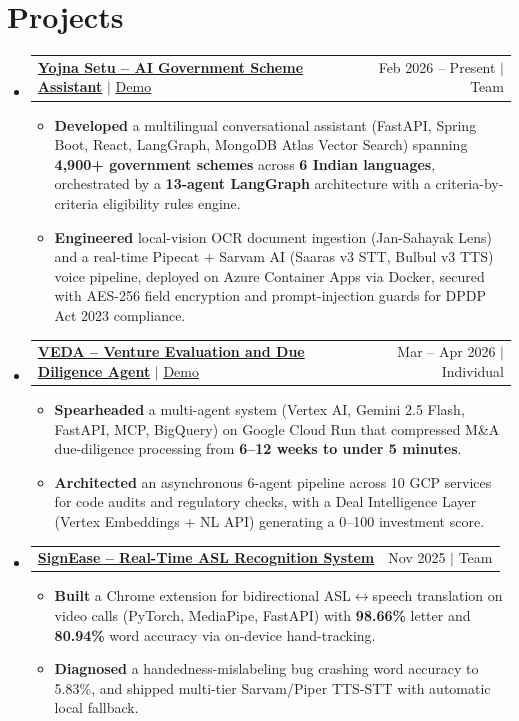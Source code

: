 \documentclass[letterpaper,11pt]{article}
\makeatletter
\newcommand{\resumeItem}[1]{\item\small{#1\vspace{-3pt}}}
\newcommand{\resumeProjectHeading}[2]{
  \item
  \begin{tabular*}{0.97\textwidth}{p{0.78\textwidth}@{\extracolsep{\fill}}r}
    \small #1 & \small #2 \\
  \end{tabular*}\vspace{-6pt}}
\newcommand{\resumeSubHeadingListStart}{\begin{itemize}[leftmargin=0.1in,label={},itemsep=0pt]}
\newcommand{\resumeSubHeadingListEnd}{\end{itemize}\vspace{-6pt}}
\newcommand{\resumeItemListStart}{\begin{itemize}[leftmargin=0.2in,itemsep=0pt]\vspace{-2pt}}
\newcommand{\resumeItemListEnd}{\end{itemize}\vspace{-6pt}}
\makeatother
\begin{document}
\section{Projects}
\resumeSubHeadingListStart
  \resumeProjectHeading
    {\href{https://github.com/RudyMontoo/YojnaSetu_v5}{\textbf{Yojna Setu -- AI Government Scheme Assistant}} $|$ \href{https://yojsarthi.in/}{\underline{Demo}}}{Feb 2026 -- Present $|$ Team }
  \resumeItemListStart
    \resumeItem{\textbf{Developed} a multilingual conversational assistant (FastAPI, Spring Boot, React, LangGraph, MongoDB Atlas Vector Search) spanning \textbf{4,900+ government schemes} across \textbf{6 Indian languages}, orchestrated by a \textbf{13-agent LangGraph} architecture with a criteria-by-criteria eligibility rules engine.}
    \resumeItem{\textbf{Engineered} local-vision OCR document ingestion (Jan-Sahayak Lens) and a real-time Pipecat + Sarvam AI (Saaras v3 STT, Bulbul v3 TTS) voice pipeline, deployed on Azure Container Apps via Docker, secured with AES-256 field encryption and prompt-injection guards for DPDP Act 2023 compliance.}
  \resumeItemListEnd
  \resumeProjectHeading
    {\href{https://github.com/RudyMontoo/VEDA}{\textbf{VEDA -- Venture Evaluation and Due Diligence Agent}} $|$ \href{https://veda-api-790567978781.us-central1.run.app}{\underline{Demo}}}{Mar -- Apr 2026 $|$ Individual}
  \resumeItemListStart
    \resumeItem{\textbf{Spearheaded} a multi-agent system (Vertex AI, Gemini 2.5 Flash, FastAPI, MCP, BigQuery) on Google Cloud Run that compressed M\&A due-diligence processing from \textbf{6--12 weeks to under 5 minutes}.}
    \resumeItem{\textbf{Architected} an asynchronous 6-agent pipeline across 10 GCP services for code audits and regulatory checks, with a Deal Intelligence Layer (Vertex Embeddings + NL API) generating a 0--100 investment score.}
  \resumeItemListEnd
  \resumeProjectHeading
    {\href{https://github.com/FaiquaNaeem/SignEase}{\textbf{SignEase -- Real-Time ASL Recognition System}}}{Nov 2025 $|$ Team}
  \resumeItemListStart
    \resumeItem{\textbf{Built} a Chrome extension for bidirectional ASL$\leftrightarrow$speech translation on video calls (PyTorch, MediaPipe, FastAPI) with \textbf{98.66\%} letter and \textbf{80.94\%} word accuracy via on-device hand-tracking.}
    \resumeItem{\textbf{Diagnosed} a handedness-mislabeling bug crashing word accuracy to 5.83\%, and shipped multi-tier Sarvam/Piper TTS-STT with automatic local fallback.}
  \resumeItemListEnd
\resumeSubHeadingListEnd
\end{document}
